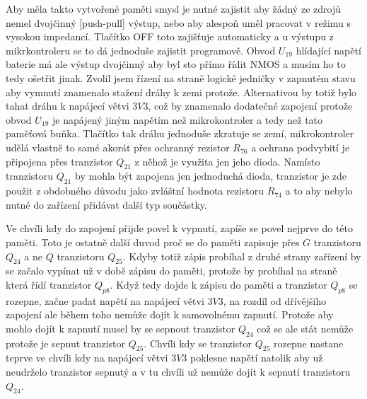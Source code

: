 Aby měla takto vytvořené paměti smysl je nutné zajistit aby žádný ze zdrojů nemel dvojčinný [push-pull] výstup, nebo aby alespoň uměl pracovat v režimu s vysokou impedancí.
Tlačítko OFF toto zajišťuje automaticky a u výstupu z mikrkontroleru se to dá jednoduše zajistit programově.
Obvod \(U_{19}\) hlídající napětí baterie má ale výstup dvojčinný aby byl sto přímo řídit NMOS a musím ho to tedy ošetřit jinak.
Zvolil jsem řízení na straně logické jedničky v zapnutém stavu aby vymnutí znamenalo stažení dráhy k zemi protože.
Alternativou by totiž bylo tahat dráhu k napájecí větvi \(3V3\), což by znamenalo dodatečné zapojení protože obvod \(U_{19}\) je napájený jiným napětím než mikrokontroler a tedy než tato paměťová buňka. 
Tlačítko tak dráhu jednoduše zkratuje se zemí, mikrokontroler udělá vlastně to samé akorát přes ochranný rezistor \(R_{76}\) a ochrana podvybití je připojena přes tranzistor \(Q_{21}\) z něhož je využita jen jeho dioda.
Namísto tranzistoru \(Q_{21}\) by mohla být zapojena jen jednoduchá dioda, tranzistor je zde použit z obdobného důvodu jako zvláštní hodnota rezistoru \(R_{74}\) a to aby nebylo nutné do zařízení přidávat další typ součástky.

Ve chvíli kdy do zapojení přijde povel k vypnutí, zapíše se povel nejprve do této paměti.
Toto je ostatně další duvod proč se do paměti zapisuje přes \(G\) tranzistoru \(Q_{24}\) a ne \(Q\) tranzistoru \(Q_{25}\).
Kdyby totiž zápis probíhal z druhé strany zařízení by se začalo vypínat už v době zápisu do paměti, protože by probíhal na straně která řídí tranzistor \(Q_{p8}\).
Když tedy dojde k zápisu do paměti a tranzistor \(Q_{p8}\) se rozepne, začne padat napětí na napájecí větvi \(3V3\), na rozdíl od dřívějšího zapojení ale během toho nemůže dojít k samovolnému zapnutí.
Protože aby mohlo dojít k zapnutí musel by se sepnout tranzistor \(Q_{24}\) což se ale stát nemůže protože je sepnut tranzistor \(Q_{25}\). 
Chvíli kdy se tranzistor \(Q_{25}\) rozepne nastane teprve ve chvíli kdy na napájecí větvi \(3V3\) poklesne napětí natolik aby už neudrželo tranzistor sepnutý a v tu chvíli už nemůže dojít k sepnutí tranzistoru \(Q_{24}\).

